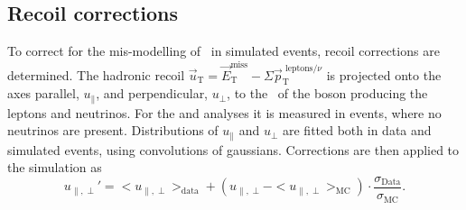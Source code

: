 
\subsection{Recoil corrections}
\label{sec:objects_met_recoilcorr}
To correct for the mis-modelling of \MET~in simulated events, recoil corrections are determined. 
The hadronic recoil $\vec{u}_{\text{T}} = \vec{E}_{\text{T}}^{\text{miss}} - \Sigma \vec{p}_{\text{T}}^{\text{ leptons}/\nu}$ 
is projected onto the axes parallel, $u_{\parallel}$, and perpendicular, $u_{\perp}$, to the \pT~of the boson producing the leptons
and neutrinos. For the \Htohhtobbtautau and \AHtotautau analyses 
it is measured in \Zmm events, where no neutrinos
are present. Distributions of $u_{\parallel}$ and $u_{\perp}$ are fitted both in data
and simulated events, using convolutions of gaussians. Corrections are then applied to the simulation
as
\begin{equation}\label{eqn:met_recoilcorr}
u_{\parallel,\perp}' = <u_{\parallel,\perp}>_{\text{data}} + (u_{\parallel,\perp} - <u_{\parallel,\perp}>_{\text{MC}}) \cdot \frac{\sigma_{\text{Data}}}{\sigma_{\text{MC}}}.
\end{equation}
